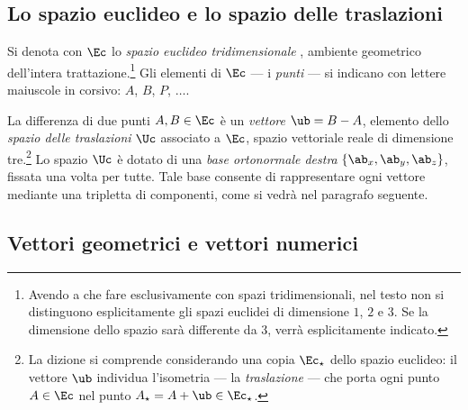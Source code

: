 \subsection{Lo spazio euclideo e lo spazio delle traslazioni}
\label{sec:spazio_euclideo}

Si denota con $\Ec$ lo \emph{spazio euclideo tridimensionale}%
, 
ambiente geometrico dell'intera trattazione.\footnote{Avendo a che 
	fare esclusivamente con spazi tridimensionali, nel testo non si 
	distinguono esplicitamente gli spazi euclidei di dimensione $1$, 
	$2$ e $3$. Se la dimensione dello spazio sarà differente da 3, verrà esplicitamente indicato.} Gli 
elementi di $\Ec$ --- i \emph{punti} --- si indicano con lettere 
maiuscole in corsivo: $A$, $B$, $P$, $\ldots$.

La differenza di due punti $A, B \in \Ec$ è un \textit{vettore} 
$\ub = B - A$, elemento dello \textit{spazio delle traslazioni} 
$\Uc$ associato a $\Ec$, spazio vettoriale reale di dimensione 
tre.\footnote{La dizione si comprende considerando una copia 
	$\Ec_\star$ dello spazio euclideo: il vettore $\ub$ individua 
	l'isometria --- la \emph{traslazione} --- che porta ogni punto 
	$A \in \Ec$ nel punto $A_\star = A + \ub \in \Ec_\star$.} Lo 
spazio $\Uc$ è dotato di una \textit{base ortonormale destra} 
$\{\ab_x, \ab_y, \ab_z\}$, fissata una volta per tutte. Tale 
base consente di rappresentare ogni vettore mediante una 
tripletta di componenti, come si vedrà nel paragrafo seguente.

\subsection{Vettori geometrici e vettori numerici}
\label{sec:vettori_geom_num}

